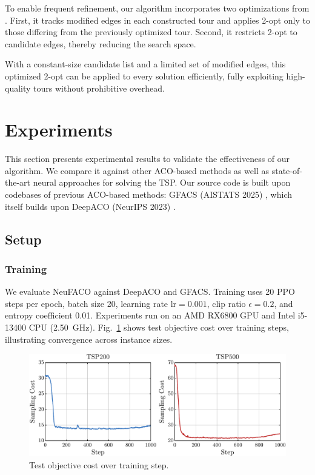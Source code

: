 \documentclass[a4paper,conference]{IEEEtran}
\begin{document}
To enable frequent refinement, our algorithm incorporates two optimizations from \cite{FACO2023}. First, it tracks modified edges in each constructed tour and applies 2-opt only to those differing from the previously optimized tour. Second, it restricts 2-opt to candidate edges, thereby reducing the search space.

With a constant-size candidate list and a limited set of modified edges, this optimized 2-opt can be applied to every solution efficiently, fully exploiting high-quality tours without prohibitive overhead.

\section{Experiments}
\hypersetup{citecolor=blue}
This section presents experimental results to validate the effectiveness of our algorithm. We compare it against other ACO-based methods as well as state-of-the-art neural approaches for solving the TSP. Our source code is built upon codebases of previous ACO-based methods: GFACS (AISTATS 2025) \cite{GFACS}, which itself builds upon DeepACO (NeurIPS 2023) \cite{DeepACO}.

\subsection{Setup}

\subsubsection{Training}
We evaluate NeuFACO against DeepACO and GFACS. Training uses 20 PPO steps per epoch, batch size 20, learning rate $\text{lr}=0.001$, clip ratio $\epsilon=0.2$, and entropy coefficient 0.01. Experiments run on an AMD RX6800 GPU and Intel i5-13400 CPU (\SI{2.50}{\giga\hertz}). Fig.~\ref{fig:val} shows test objective cost over training steps, illustrating convergence across instance sizes.


\begin{figure}[H]
  \centering
  \includegraphics[width=\linewidth]{TSP200_TSP500_Test.pdf}
  \caption{Test objective cost over training step.}
  \label{fig:val}
\end{figure}
\end{document}
